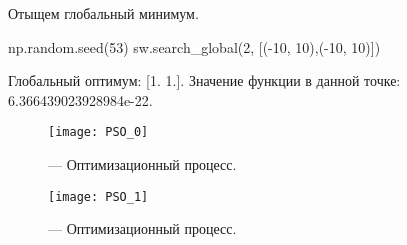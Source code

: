 Отыщем глобальный минимум.
\begin{pyin}
np.random.seed(53)
sw.search_global(2, [(-10, 10),(-10, 10)])
\end{pyin}

\begin{pyout}
Глобальный оптимум: [1. 1.].
Значение функции в данной точке: 6.366439023928984e-22.
\end{pyout}

\begin{figure}[h!]
\centering
\texttt{[image: PSO\_0]}
\caption{ --- Оптимизационный процесс.}
\label{img:PSO_0}
\end{figure}

\begin{figure}[h!]
\centering
\texttt{[image: PSO\_1]}
\caption{ --- Оптимизационный процесс.}
\label{img:PSO_1}
\end{figure}
